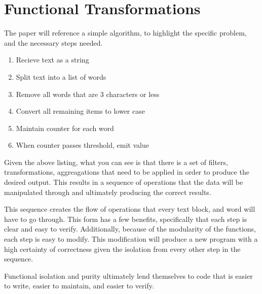 \chapter{Functional Transformations}

The paper will reference a simple algorithm, to highlight the specific problem, and the necessary steps needed.

\begin{enumerate}
  \item Recieve text as a string
  \item Split text into a list of words
  \item Remove all words that are 3 characters or less
  \item Convert all remaining items to lower case
  \item Maintain counter for each word 
  \item When counter passes threshold, emit value
\end{enumerate}

Given the above listing, what you can see is that there is a set of filters, transformations, aggreagations that need to be applied in order to produce the desired output.  This results in a sequence of operations that the data will be manipulated through and ultimately producing the correct results.  

This sequence creates the flow of operations that every text block, and word will have to go through.  This form has a few benefits, specifically that each step is clear and easy to verify.  Additionally, because of the modularity of the functions, each step is easy to modify.  This modification will produce a new program with a high certainty of correctness given the isolation from every other step in the sequence.  

Functional isolation and purity ultimately lend themselves to code that is easier to write, easier to maintain, and easier to verify.  


